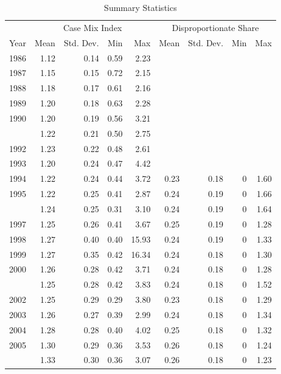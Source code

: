 \documentclass[
  12pt,
]{article}
\begin{document}
\begin{table}[H]

\caption{\label{tab:sum-stats}Summary Statistics}
\centering
\begin{tabular}[t]{lrrrrrrrr}
\toprule
\multicolumn{1}{c}{ } & \multicolumn{4}{c}{Case Mix Index} & \multicolumn{4}{c}{Disproportionate Share} \\
\cmidrule(l{3pt}r{3pt}){2-5} \cmidrule(l{3pt}r{3pt}){6-9}
Year & Mean & Std. Dev. & Min & Max & Mean & Std. Dev. & Min & Max\\
\midrule
1986 & 1.12 & 0.14 & 0.59 & 2.23 &  &  &  & \\
1987 & 1.15 & 0.15 & 0.72 & 2.15 &  &  &  & \\
1988 & 1.18 & 0.17 & 0.61 & 2.16 &  &  &  & \\
1989 & 1.20 & 0.18 & 0.63 & 2.28 &  &  &  & \\
1990 & 1.20 & 0.19 & 0.56 & 3.21 &  &  &  & \\
\addlinespace
1991 & 1.22 & 0.21 & 0.50 & 2.75 &  &  &  & \\
1992 & 1.23 & 0.22 & 0.48 & 2.61 &  &  &  & \\
1993 & 1.20 & 0.24 & 0.47 & 4.42 &  &  &  & \\
1994 & 1.22 & 0.24 & 0.44 & 3.72 & 0.23 & 0.18 & 0 & 1.60\\
1995 & 1.22 & 0.25 & 0.41 & 2.87 & 0.24 & 0.19 & 0 & 1.66\\
\addlinespace
1996 & 1.24 & 0.25 & 0.31 & 3.10 & 0.24 & 0.19 & 0 & 1.64\\
1997 & 1.25 & 0.26 & 0.41 & 3.67 & 0.25 & 0.19 & 0 & 1.28\\
1998 & 1.27 & 0.40 & 0.40 & 15.93 & 0.24 & 0.19 & 0 & 1.33\\
1999 & 1.27 & 0.35 & 0.42 & 16.34 & 0.24 & 0.18 & 0 & 1.30\\
2000 & 1.26 & 0.28 & 0.42 & 3.71 & 0.24 & 0.18 & 0 & 1.28\\
\addlinespace
2001 & 1.25 & 0.28 & 0.42 & 3.83 & 0.24 & 0.18 & 0 & 1.52\\
2002 & 1.25 & 0.29 & 0.29 & 3.80 & 0.23 & 0.18 & 0 & 1.29\\
2003 & 1.26 & 0.27 & 0.39 & 2.99 & 0.24 & 0.18 & 0 & 1.34\\
2004 & 1.28 & 0.28 & 0.40 & 4.02 & 0.25 & 0.18 & 0 & 1.32\\
2005 & 1.30 & 0.29 & 0.36 & 3.53 & 0.26 & 0.18 & 0 & 1.24\\
\addlinespace
2006 & 1.33 & 0.30 & 0.36 & 3.07 & 0.26 & 0.18 & 0 & 1.23\\

\end{tabular}
\end{table}
\end{document}
